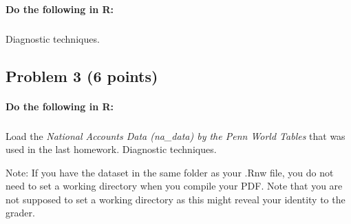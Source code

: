 \documentclass[12pt]{article}
\begin{document}
\paragraph{Do the following in R:}

\subparagraph{} Diagnostic techniques.



\subsection*{Problem 3 (6 points)}

\paragraph{Do the following in R:}

\subparagraph{} Load the \textit{National Accounts Data (na\_data) by the Penn World Tables} that was used in the last homework. Diagnostic techniques.

Note: If you have the dataset in the same folder as your .Rnw file, you do not need to set a working directory when you compile your PDF. Note that you are not supposed to set a working directory as this might reveal your identity to the grader.
\end{document}
